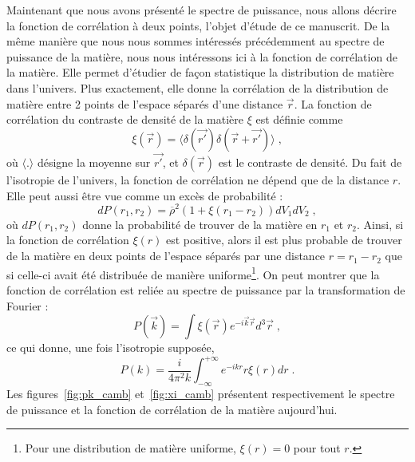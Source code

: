Maintenant que nous avons présenté le spectre de puissance, nous allons décrire la fonction de corrélation à deux points, l'objet d'étude de ce manuscrit. De la même manière que nous nous sommes intéressés précédemment au spectre de puissance de la matière, nous nous intéressons ici à la fonction de corrélation de la matière. Elle permet d'étudier de façon statistique la distribution de matière dans l'univers. Plus exactement, elle donne la corrélation de la distribution de matière entre 2 points de l'espace séparés d'une distance $\vec r$. La fonction de corrélation du contraste de densité de la matière $\xi$ est définie comme
\begin{equation}
  \label{eq:def_cf}
  \xi(\vec r) = \langle \delta(\vec{r'}) \delta(\vec{r} + \vec{r'}) \rangle \; ,
\end{equation}
où $\langle.\rangle$ désigne la moyenne sur $\vec{r'}$, et $\delta(\vec{r})$ est le contraste de densité.
Du fait de l'isotropie de l'univers, la fonction de corrélation ne dépend que de la distance $r$.
Elle peut aussi être vue comme un excès de probabilité :
\begin{equation}
  \label{eq:def_cf2}
  dP(r_{1}, r_{2}) = \overline \rho^{2} ( 1 + \xi(r_{1} - r_{2})) dV_{1} dV_{2}  \; ,
\end{equation}
où $dP(r_{1}, r_{2})$ donne la probabilité de trouver de la matière en $r_{1}$ et $r_{2}$.
Ainsi, si la fonction de corrélation $\xi(r)$ est positive, alors il est plus probable de trouver de la matière en deux points de l'espace séparés par une distance $r = r_{1} - r_{2}$ que si celle-ci avait été distribuée de manière uniforme\footnote{Pour une distribution de matière uniforme, $\xi(r) = 0$ pour tout $r$.}.
On peut montrer que la fonction de corrélation est reliée au spectre de puissance par la transformation de Fourier :
\begin{equation}
  \label{eq:cf_tf}
  P(\vec{k}) = \int \xi(\vec{r}) e^{- i \vec{k} \vec{r}} d^3\vec{r}  \; ,
\end{equation}
ce qui donne, une fois l'isotropie supposée,
\begin{equation}
  \label{eq:cf_tf2}
  P(k) = \frac{i}{4 \pi^2 k} \int_{-\infty}^{+\infty} e^{- i k r} r \xi(r) dr  \; .
\end{equation}
Les figures~\ref{fig:pk_camb} et~\ref{fig:xi_camb} présentent respectivement le spectre de puissance et la fonction de corrélation de la matière aujourd'hui.
